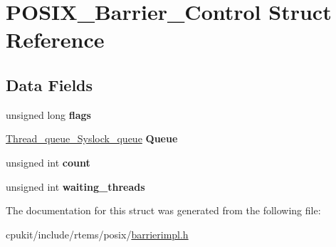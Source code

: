 \hypertarget{structPOSIX__Barrier__Control}{}\section{P\+O\+S\+I\+X\+\_\+\+Barrier\+\_\+\+Control Struct Reference}
\label{structPOSIX__Barrier__Control}
\subsection*{Data Fields}
\begin{DoxyCompactItemize}
\item 
\mbox{\label{structPOSIX__Barrier__Control_a3acd3603c710eaf36e89f8267cf6d536}} 
unsigned long {\bfseries flags}
\item 
\mbox{\label{structPOSIX__Barrier__Control_aa01364ccd7b859cd10a16377254c6e80}} 
\mbox{\hyperlink{structThread__queue__Syslock__queue}{Thread\+\_\+queue\+\_\+\+Syslock\+\_\+queue}} {\bfseries Queue}
\item 
\mbox{\label{structPOSIX__Barrier__Control_ae7986f1a26805fff1f816872f77b7d9a}} 
unsigned int {\bfseries count}
\item 
\mbox{\label{structPOSIX__Barrier__Control_a51b64d542fa009fc688654a38662c69d}} 
unsigned int {\bfseries waiting\+\_\+threads}
\end{DoxyCompactItemize}


The documentation for this struct was generated from the following file\+:\begin{DoxyCompactItemize}
\item 
cpukit/include/rtems/posix/\mbox{\hyperlink{posix_2barrierimpl_8h}{barrierimpl.\+h}}\end{DoxyCompactItemize}
